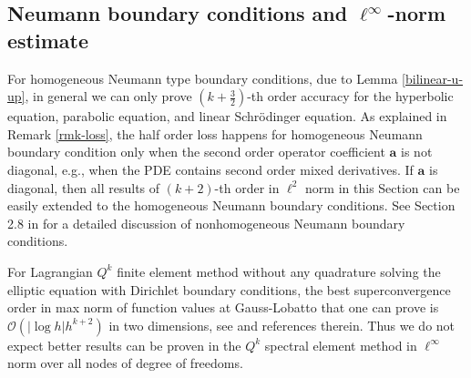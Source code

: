 \documentclass[onefignum,onetabnum]{siamart171218}
\begin{document}
 \subsection{Neumann boundary conditions and $\ell^\infty$-norm estimate}
 \label{sec-Neumann}
 
 For homogeneous Neumann type boundary conditions, due to Lemma \ref{bilinear-u-up},  in general we can only prove $(k+\frac32)$-th order accuracy for the hyperbolic equation, parabolic equation, and linear Schr\"{o}dinger equation. As explained in Remark \ref{rmk-loss}, the half order loss
happens for homogeneous Neumann boundary condition only when the second order operator coefficient $\mathbf a$ is not diagonal, e.g., when the PDE contains second order mixed derivatives. If  $\mathbf a$ is diagonal, then all results of $(k+2)$-th order in $\ell^2$ norm in this Section can be easily extended to the homogeneous Neumann boundary conditions.  See Section 2.8 in \cite{Li2021} for a detailed discussion of nonhomogeneous Neumann boundary conditions. 
 
 For Lagrangian $Q^k$ finite element method without any quadrature solving the elliptic equation with Dirichlet boundary conditions,  the best superconvergence order in max norm of function values at Gauss-Lobatto that one can prove is   $\mathcal O(|\log h| h^{k+2})$ in two dimensions, see \cite{li2020superconvergence} and references therein. 
Thus we do not expect better results can be proven in 
the $Q^k$ spectral element method in $\ell^\infty$ norm over all nodes of degree of freedoms.  
\end{document}
